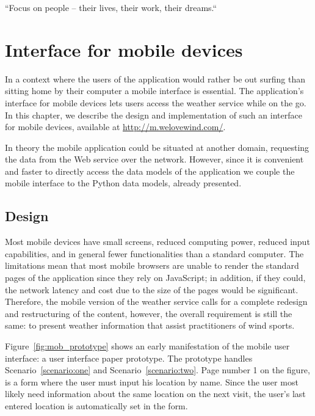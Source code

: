 \begin{savequote}[10pc]
\sffamily
``Focus on people -- their lives, their work, their dreams.``
\end{savequote}

\lstset{language=Python}
\chapter{Interface for mobile devices}\label{chap:mobile}
In a context where the users of the application would rather be out surfing than
sitting home by their computer a mobile interface is essential. The application's
interface for mobile devices lets users access the weather service while on the
go. In this chapter, we describe the design and implementation of such an
interface for mobile devices, available at \url{http://m.welovewind.com/}.

In theory the mobile application could be situated at another domain, requesting
the data from the Web service over the network. However, since it is convenient
and faster to directly access the data models of the application we couple the
mobile interface to the Python data models, already presented.


\section{Design}
Most mobile devices have small screens, reduced computing power, reduced input
capabilities, and in general fewer functionalities than a standard computer. The
limitations mean that most mobile browsers are unable to render the standard
pages of the application since they rely on JavaScript; in addition, if they
could, the network latency and cost due to the size of the pages would be
significant. Therefore, the mobile version of the weather service calls for a
complete redesign and restructuring of the content, however, the overall
requirement is still the same: to present weather information that assist
practitioners of wind sports.

Figure~\ref{fig:mob_prototype} shows an early manifestation of the mobile user
interface: a user interface paper prototype. The prototype handles
Scenario~\ref{scenario:one} and Scenario~\ref{scenario:two}. Page number 1 on
the figure, is a form where the user must input his location by name. Since the
user most likely need information about the same location on the next visit, the
user's last entered location is automatically set in the form.

